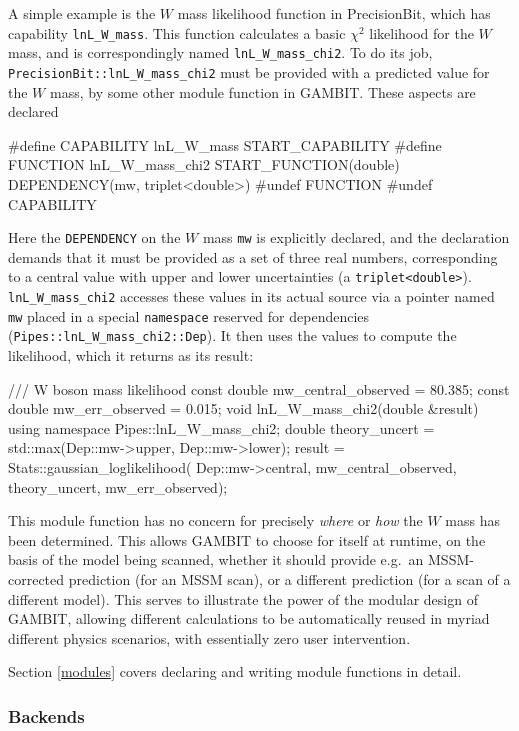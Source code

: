 \documentclass[pdftex,twocolumn,epjc3_preprint,runningheads]{svjour3}
\renewcommand{\_}{\discretionary{\underscore}{}{\underscore}}
\newcommand\cpp[1]{{\lstinline!#1!}}  %
\newcommand{\gambit}{\textsf{GAMBIT}\xspace}
\newcommand{\precisionbit}{\textsf{PrecisionBit}\xspace}
\newcommand{\GB}{\gambit}
\begin{document}
A simple example is the $W$ mass likelihood function in \precisionbit, which has capability \cpp{lnL_W_mass}. This function calculates a basic $\chi^2$ likelihood for the $W$ mass, and is correspondingly named \cpp{lnL_W_mass_chi2}.  To do its job, \cpp{PrecisionBit::lnL_W_mass_chi2} must be provided with a predicted value for the $W$ mass, by some other module function in \GB.  These aspects are declared
\begin{lstcpp}
#define CAPABILITY lnL_W_mass
START_CAPABILITY
  #define FUNCTION lnL_W_mass_chi2
  START_FUNCTION(double)
  DEPENDENCY(mw, triplet<double>)
  #undef FUNCTION
#undef CAPABILITY
\end{lstcpp}
Here the \cpp{DEPENDENCY} on the $W$ mass \cpp{mw} is explicitly declared, and the declaration demands that it must be provided as a set of three real numbers, corresponding to a central value with upper and lower uncertainties (a \cpp{triplet<double>}).  \cpp{lnL_W_mass_chi2} accesses these values in its actual source via a pointer named \cpp{mw} placed in a special \cpp{namespace} reserved for dependencies (\cpp{Pipes::lnL_W_mass_chi2::Dep}).  It then uses the values to compute the likelihood, which it returns as its result:
\begin{lstcpp}
/// W boson mass likelihood
const double mw_central_observed = 80.385;
const double mw_err_observed = 0.015;
void lnL_W_mass_chi2(double &result)
{
  using namespace Pipes::lnL_W_mass_chi2;
  double theory_uncert = std::max(Dep::mw->upper,
   Dep::mw->lower);
  result = Stats::gaussian_loglikelihood(
   Dep::mw->central, mw_central_observed,
   theory_uncert, mw_err_observed);
}
\end{lstcpp}

This module function has no concern for precisely \textit{where} or \textit{how} the $W$ mass has been determined.  This allows \GB to choose for itself at runtime, on the basis of the model being scanned, whether it should provide e.g.\ an MSSM-corrected prediction (for an MSSM scan), or a different prediction (for a scan of a different model).  This serves to illustrate the power of the modular design of \GB, allowing different calculations to be automatically reused in myriad different physics scenarios, with essentially zero user intervention.

Section \ref{modules} covers declaring and writing module functions in detail.

\subsubsection{Backends}
\end{document}
